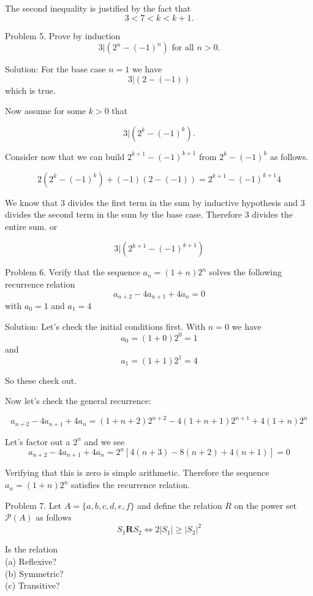 \documentclass[16 pt]{amsart}
\theoremstyle{definition}
\theoremstyle{remark}
\numberwithin{equation}{subsection}
\begin{document}
The second inequality is justified by the fact that 
\[
3 < 7 < k < k+1.
\]

\newpage 

Problem 5.
Prove by induction
\[
3 | (2^n - (-1)^n) \text{ for all } n>0.
\]

\vspace{1in}

Solution: For the base case $n=1$ we have
\[
3 | (2 - (-1))
\]
which is true.

Now assume for some $k>0$ that

\[
3 | (2^k - (-1)^k).
\]

Consider now that we can build $2^{k+1} - (-1)^{k+1}$ from $2^k - (-1)^k$ as follows.

\[
2(2^k - (-1)^k) + (-1)(2- (-1)) = 2^{k+1} - (-1)^{k+1}4
\]

We know that $3$ divides the first term in the sum by inductive hypothesis and $3$ divides the second term in the sum by the base case.  Therefore $3$ divides the entire sum.  or

\[
3 | (2^{k+1} - (-1)^{k+1})
\]

\newpage

Problem 6.
Verify that the sequence $a_n =(1+n) 2^n $ solves the following recurrence relation
\[
a_{n+2} - 4a_{n+1} + 4a_n = 0 
\]
with $a_0 =1$ and $a_1 = 4$

\vspace{1in}

Solution: Let's check the initial conditions first.  With $n=0$ we have 
\[
a_0 = (1+0)2^0 = 1
\]
and
\[
a_1 = (1+1)2^1 = 4
\]

So these check out.

Now let's check the general recurrence:

\[
a_{n+2} - 4 a_{n+1} + 4a_n = (1+n+2)2^{n+2} - 4(1+n+1)2^{n+1} + 4(1+n)2^n
\]

Let's factor out a $2^n$ and we see
\[
a_{n+2} - 4 a_{n+1} + 4a_n = 2^n [4(n+3)-8(n+2)+4(n+1)] = 0
\]

Verifying that this is zero is simple arithmetic.  Therefore the sequence $a_n = (1+n)2^n$ satisfies the recurrence relation.

\newpage

Problem 7. Let $A= \{a,b,c,d,e,f\}$ and define the relation $R$ on the power set $\mathcal{P}(A)$ as follows
\[
S_1 \textbf{R} S_2 \iff 2|S_1| \ge |S_2|^2
\]

Is the relation\\
(a) Reflexive?\\
(b) Symmetric?\\
(c) Transitive?
\end{document}
